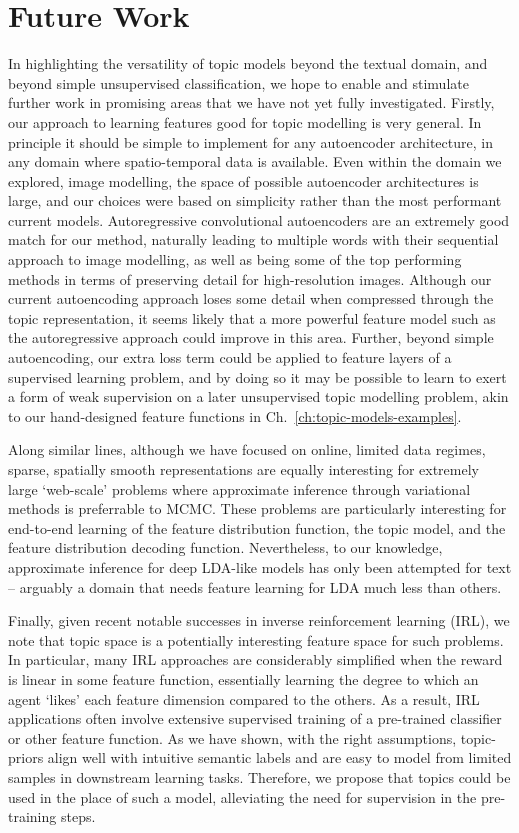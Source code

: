 \section{Future Work}
In highlighting the versatility of topic models beyond the textual domain, and beyond simple unsupervised classification, we hope to enable and stimulate further work in promising areas that we have not yet fully investigated. Firstly, our approach to learning features good for topic modelling is very general. In principle it should be simple to implement for any autoencoder architecture, in any domain where spatio-temporal data is available. Even within the domain we explored, image modelling, the space of possible autoencoder architectures is large, and our choices were based on simplicity rather than the most performant current models. Autoregressive convolutional autoencoders are an extremely good match for our method, naturally leading to multiple words with their sequential approach to image modelling, as well as being some of the top performing methods in terms of preserving detail for high-resolution images. Although our current autoencoding approach loses some detail when compressed through the topic representation, it seems likely that a more powerful feature model such as the autoregressive approach could improve in this area. Further, beyond simple autoencoding, our extra loss term could be applied to feature layers of a supervised learning problem, and by doing so it may be possible to learn to exert a form of weak supervision on a later unsupervised topic modelling problem, akin to our hand-designed feature functions in Ch.~\ref{ch:topic-models-examples}.

Along similar lines, although we have focused on online, limited data regimes, sparse, spatially smooth representations are equally interesting for extremely large `web-scale' problems where approximate inference through variational methods is preferrable to MCMC. These problems are particularly interesting for end-to-end learning of the feature distribution function, the topic model, and the feature distribution decoding function. Nevertheless, to our knowledge, approximate inference for deep LDA-like models has only been attempted for text -- arguably a domain that needs feature learning for LDA much less than others.

Finally, given recent notable successes in inverse reinforcement learning (IRL), we note that topic space is a potentially interesting feature space for such problems. In particular, many IRL approaches are considerably simplified when the reward is linear in some feature function, essentially learning the degree to which an agent `likes' each feature dimension compared to the others. As a result, IRL applications often involve extensive supervised training of a pre-trained classifier or other feature function. As we have shown, with the right assumptions, topic-priors align well with intuitive semantic labels and are easy to model from limited samples in downstream learning tasks. Therefore, we propose that topics could be used in the place of such a model, alleviating the need for supervision in the pre-training steps.

